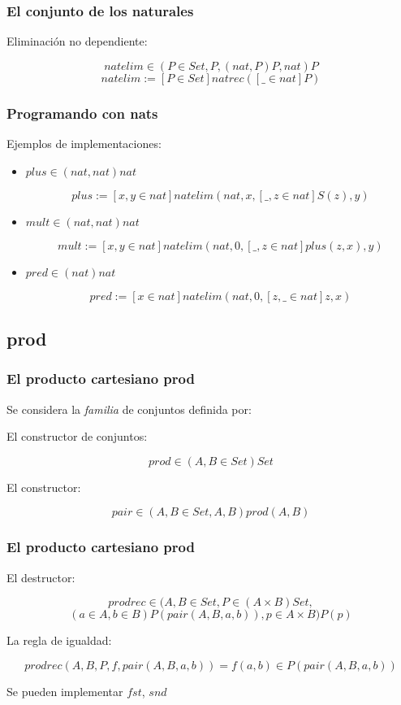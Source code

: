 \documentclass{beamer}
\begin{document}
\begin{frame}\frametitle{El conjunto de los naturales}
  Eliminaci\'on no dependiente:

  $$natelim \in (P\in Set, P, (nat,P)P, nat)P $$
  $$natelim := [P\in Set] natrec([ \_ \in nat]P)$$
\end{frame}

\begin{frame}\frametitle{Programando con nats}

  Ejemplos de implementaciones:
  \pause

  \begin{itemize}
  \item
    $plus \in (nat,nat)nat $\pause
    
    $$plus := [x,y \in nat] natelim (nat,x,[\_,z\in nat]S(z), y) $$
    
    \pause

    \item
      $mult \in (nat,nat)nat $\pause
      
      $$mult := [x,y \in nat] natelim (nat,0,[\_,z\in nat]plus(z,x), y) $$

      \pause
    \item
      $pred \in (nat)nat $\pause
      
      $$pred := [x \in nat] natelim (nat,0,[z, \_ \in nat] z,x)$$
  \end{itemize}  
\end{frame}



\subsection{prod}

\begin{frame}\frametitle{El producto cartesiano prod}
  Se considera la \emph{familia} de conjuntos definida por:

  \pause

  El constructor de conjuntos:
  
  $$prod \in (A, B \in Set)Set$$
    
  \pause

  El constructor:

  $$pair \in (A,B \in Set, A, B)prod(A,B) $$
\end{frame}

\begin{frame}\frametitle{El producto cartesiano prod}
  \pause

  El destructor:

  
  $$prodrec \in (A,B \in Set, P \in (A \times B)Set,$$
  $$(a \in A, b \in B)P(pair(A,B,a,b)), p \in A \times B) P(p)$$
    
  \pause

 La regla de igualdad:

  $$prodrec(A,B,P,f,pair(A,B,a,b)) = f(a,b) \in P(pair(A,B,a,b)) $$

 \pause
 Se pueden implementar $fst$, $snd$
 
\end{frame}
\end{document}
